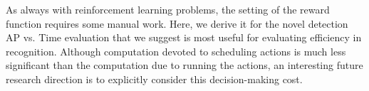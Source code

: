 \documentclass{article} %
\begin{document}
As always with reinforcement learning problems, the setting of the reward function requires some manual work.
Here, we derive it for the novel detection AP vs. Time evaluation that we suggest is most useful for evaluating efficiency in recognition.
Although computation devoted to scheduling actions is much less significant than the computation due to running the actions, an interesting future research direction is to explicitly consider this decision-making cost.


\renewcommand\bibsection{\subsubsection*{\refname}}

\small{
  
}
\end{document}
